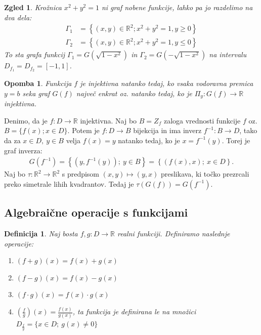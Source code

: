 \documentclass[10pt, a4paper]{article}
\newtheorem{defi}[izr]{Definicija}
\newenvironment{noticeB}{%
  \tcolorbox[%
  notitle,
  empty,
  enhanced,  %
  breakable,
  coltext=black,
  colback=white, 
  fontupper=\rmfamily,
  noparskip,
  sharp corners,
  boxrule=-1pt,  %
  frame hidden,
  left=7pt,  %
  right=7pt,
  top=5pt,
  bottom=5pt,
  before skip=2.5ex plus 2pt,
  after skip=2.5ex plus 2pt,
  borderline west = {1.5pt}{-0.1pt}{blue!30!black}, %
  overlay unbroken and last={%
    \draw[color=black, line width=1.25pt]
    ($(frame.south west)+(1.pt, -0.1pt)$) -- ++(2em, 0);
  }
  ]}
{\endtcolorbox}
\newenvironment{definicija}{\begin{noticeB}\begin{defi}}{%
\end{defi}\end{noticeB}}
\newtheorem*{opomba}{Opomba}
\newtheorem{zgled}[izr]{Zgled}
\newcommand{\R}{\mathbb {R}}
\begin{document}
\begin{zgled}
    Krožnica $x^2 + y^2 = 1$ ni graf nobene funkcije, lahko pa jo razdelimo na dva dela:
    \begin{align*}
        \Gamma_1 &= \left\lbrace (x,y)\in \R^2; x^2 + y^2 = 1, y \geq 0 \right\rbrace\\
        \Gamma_2 &= \left\lbrace (x,y)\in \R^2; x^2 + y^2 = 1, y \leq 0 \right\rbrace
    \end{align*}
    To sta grafa funkcij $\Gamma_1 = G \left( \sqrt{1-x^2} \right)$ in $\Gamma_2 = G \left( -\sqrt{1-x^2} \right)$ na intervalu $D_{f_1} = D_{f_2} = [-1,1]$.
\end{zgled}

\begin{opomba}
    Funkcija $f$ je injektivna natanko tedaj, ko vsaka vodoravna premica $y=b$ seka graf $G(f)$ največ enkrat oz. natanko tedaj, ko je
    $\Pi_y: G(f) \rightarrow\R$ injektivna.
\end{opomba}

Denimo, da je $f:D \rightarrow \R$ injektivna. Naj bo $B = Z_f$ zaloga vrednosti funkcije $f$ oz.
$B=\{f(x); x \in D\}.$ Potem je $f: D \rightarrow B$ bijekcija in ima inverz $f^{-1} : B \rightarrow D$, tako da za $x \in D,\ y \in B$ velja
$f(x) = y$ natanko tedaj, ko je $x = f^{-1}(y).$
Torej je graf inverza:
\begin{align*}
    G(f^{-1}) = \left\lbrace (y, f^{-1}(y));\ y \in B \right\rbrace
    = \left\lbrace (f(x), x);\ x \in D \right\rbrace.
\end{align*}
Naj bo $\tau: \R^2 \rightarrow \R^2$ s predpisom $(x,y) \mapsto (y,x)$
preslikava, ki točko prezrcali preko simetrale lihih kvadrantov. Tedaj je
$\tau (G(f)) = G(f^{-1}).$

\subsection{Algebraične operacije s funkcijami}

\begin{definicija}
    Naj bosta $f,g: D \rightarrow \R$ realni funkciji.
    Definiramo naslednje operacije:
    \begin{enumerate}
        \item $(f+g)(x) = f(x) + g(x)$
        \item $(f-g)(x) = f(x) - g(x)$
        \item $(f \cdot g)(x) = f(x) \cdot g(x)$
        \item $(\frac{f}{g})(x) = \frac{f(x)}{g(x)}$, ta funkcija je definirana le na množici $D_{\frac{f}{g}} = \{x \in D;\ g(x) \neq 0\}$
    \end{enumerate}
\end{definicija}
\end{document}
